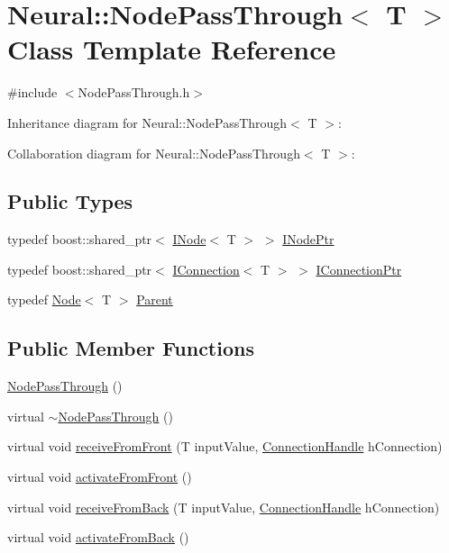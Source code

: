 \hypertarget{class_neural_1_1_node_pass_through}{
\section{Neural::NodePassThrough$<$ T $>$ Class Template Reference}
\label{class_neural_1_1_node_pass_through}
}


{\ttfamily \#include $<$NodePassThrough.h$>$}



Inheritance diagram for Neural::NodePassThrough$<$ T $>$:


Collaboration diagram for Neural::NodePassThrough$<$ T $>$:
\subsection*{Public Types}
\begin{DoxyCompactItemize}
\item 
typedef boost::shared\_\-ptr$<$ \hyperlink{class_neural_1_1_i_node}{INode}$<$ T $>$ $>$ \hyperlink{class_neural_1_1_node_pass_through_a24652ff9763214e8e0d4a63c0cec169f}{INodePtr}
\item 
typedef boost::shared\_\-ptr$<$ \hyperlink{class_neural_1_1_i_connection}{IConnection}$<$ T $>$ $>$ \hyperlink{class_neural_1_1_node_pass_through_abad3481def64e79eb5d4c7e1a9155106}{IConnectionPtr}
\item 
typedef \hyperlink{class_neural_1_1_node}{Node}$<$ T $>$ \hyperlink{class_neural_1_1_node_pass_through_ab7c100222c3d2560f7fc152e22397d85}{Parent}
\end{DoxyCompactItemize}
\subsection*{Public Member Functions}
\begin{DoxyCompactItemize}
\item 
\hyperlink{class_neural_1_1_node_pass_through_a69ab1768f0c505b2afcc6ddbef8c674f}{NodePassThrough} ()
\item 
virtual \hyperlink{class_neural_1_1_node_pass_through_a52cc77ab8aaaa8e2ffbcff0908972c53}{$\sim$NodePassThrough} ()
\item 
virtual void \hyperlink{class_neural_1_1_node_pass_through_af138e9aa6b5de64431e0298b7622b790}{receiveFromFront} (T inputValue, \hyperlink{namespace_neural_a73b2763d14999ad4308dbf4246aa503f}{ConnectionHandle} hConnection)
\item 
virtual void \hyperlink{class_neural_1_1_node_pass_through_a9456e17114a41371c8c111ae1ba88b01}{activateFromFront} ()
\item 
virtual void \hyperlink{class_neural_1_1_node_pass_through_af9ddefb5fa4d40e26b468913302dcb95}{receiveFromBack} (T inputValue, \hyperlink{namespace_neural_a73b2763d14999ad4308dbf4246aa503f}{ConnectionHandle} hConnection)
\item 
virtual void \hyperlink{class_neural_1_1_node_pass_through_a7f40f357a433661832fd354773cdd92b}{activateFromBack} ()
\end{DoxyCompactItemize}


